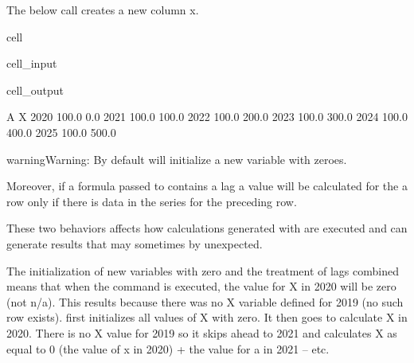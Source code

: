 \documentclass[letterpaper,10pt,english]{jupyterBook}
\begin{document}
\sphinxAtStartPar
The below call creates a new column x.

\begin{sphinxuseclass}{cell}\begin{sphinxVerbatimInput}

\begin{sphinxuseclass}{cell_input}
\begin{sphinxVerbatim}[commandchars=\\\{\}]
\end{sphinxVerbatim}

\end{sphinxuseclass}\end{sphinxVerbatimInput}
\begin{sphinxVerbatimOutput}

\begin{sphinxuseclass}{cell_output}
\begin{sphinxVerbatim}[commandchars=\\\{\}]
          A      X
2020  100.0    0.0
2021  100.0  100.0
2022  100.0  200.0
2023  100.0  300.0
2024  100.0  400.0
2025  100.0  500.0
\end{sphinxVerbatim}

\end{sphinxuseclass}\end{sphinxVerbatimOutput}

\end{sphinxuseclass}
\begin{sphinxadmonition}{warning}{Warning:}
\sphinxAtStartPar
By default  will initialize a new variable with zeroes.

\sphinxAtStartPar
Moreover, if a formula passed to  contains a lag a value will be calculated for the a row only if there is data in the series for the preceding row.

\sphinxAtStartPar
These two behaviors affects how calculations generated with  are executed and can generate results that may sometimes by unexpected.
\end{sphinxadmonition}

\sphinxAtStartPar
The initialization of new variables with zero and the treatment of lags combined means that when the command  is executed, the value for X in 2020 will be zero (not n/a). This results because there was no X variable defined for 2019 (no such row exists).  first initializes all values of X with zero.  It then goes to calculate X in 2020.  There is no X value for 2019 so it skips ahead to 2021 and calculates X as equal to 0 (the value of x in 2020) + the value for a in 2021 – etc.
\end{document}
